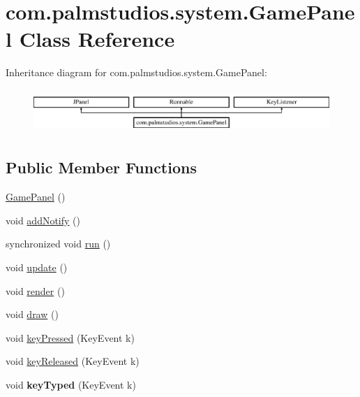 \hypertarget{classcom_1_1palmstudios_1_1system_1_1_game_panel}{}\section{com.\+palmstudios.\+system.\+Game\+Panel Class Reference}
\label{classcom_1_1palmstudios_1_1system_1_1_game_panel}
Inheritance diagram for com.\+palmstudios.\+system.\+Game\+Panel\+:\begin{figure}[H]
\begin{center}
\leavevmode
\includegraphics[height=1.681682cm]{classcom_1_1palmstudios_1_1system_1_1_game_panel}
\end{center}
\end{figure}
\subsection*{Public Member Functions}
\begin{DoxyCompactItemize}
\item 
\hyperlink{classcom_1_1palmstudios_1_1system_1_1_game_panel_a2da3a53afc0446109b94d0374e30511c}{Game\+Panel} ()
\item 
void \hyperlink{classcom_1_1palmstudios_1_1system_1_1_game_panel_a237992220d3ee6f2c87f8e7261c5b877}{add\+Notify} ()
\item 
synchronized void \hyperlink{classcom_1_1palmstudios_1_1system_1_1_game_panel_a181e3cb0d4a9ff996e47d54b1c04a604}{run} ()
\item 
void \hyperlink{classcom_1_1palmstudios_1_1system_1_1_game_panel_a6d924afc5751fefc2701c8351d97003e}{update} ()
\item 
void \hyperlink{classcom_1_1palmstudios_1_1system_1_1_game_panel_ab0a60a9f1f5e75d5918f0060e2381cf2}{render} ()
\item 
void \hyperlink{classcom_1_1palmstudios_1_1system_1_1_game_panel_a4a6fdc3f71c4d80f58c96ffa0ff63952}{draw} ()
\item 
void \hyperlink{classcom_1_1palmstudios_1_1system_1_1_game_panel_a81fdef9cd0346ecce13d9644ea6039da}{key\+Pressed} (Key\+Event k)
\item 
void \hyperlink{classcom_1_1palmstudios_1_1system_1_1_game_panel_a343e9f5c8be07c3d18c711ce0168bdce}{key\+Released} (Key\+Event k)
\item 
\mbox{\label{classcom_1_1palmstudios_1_1system_1_1_game_panel_ac619f34aed7c0a3b0632a7473e782b1f}} 
void {\bfseries key\+Typed} (Key\+Event k)
\end{DoxyCompactItemize}

